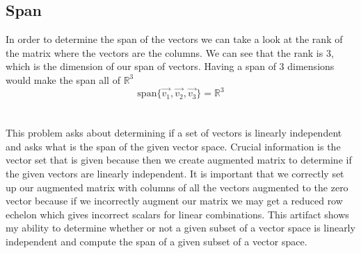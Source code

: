 \documentclass[12pt]{article}
\begin{document}
\subsection{Span}
In order to determine the span of the vectors we can take a look at the rank of the matrix where the vectors are the columns. We can see that the rank is 3, which is the dimension of our span of vectors. Having a span of 3 dimensions would make the span all of $\mathbb{R}^3$
\begin{equation*}\text{span}\{\vec{v_1}, \vec{v_2}, \vec{v_3}\} = \mathbb{R}^3\end{equation*}
\\\\
This problem asks about determining if a set of vectors is linearly independent and asks what is the span of the given vector space. Crucial information is the vector set that is given because then we create augmented matrix to determine if the given vectors are linearly independent. It is important that we correctly set up our augmented matrix with columns of all the vectors augmented to the zero vector because if we incorrectly augment our matrix we may get a reduced row echelon which gives incorrect scalars for linear combinations. This artifact shows my ability to determine whether or not a given subset of a vector space is linearly independent and compute the span of a given subset of a vector space.
\end{document}
